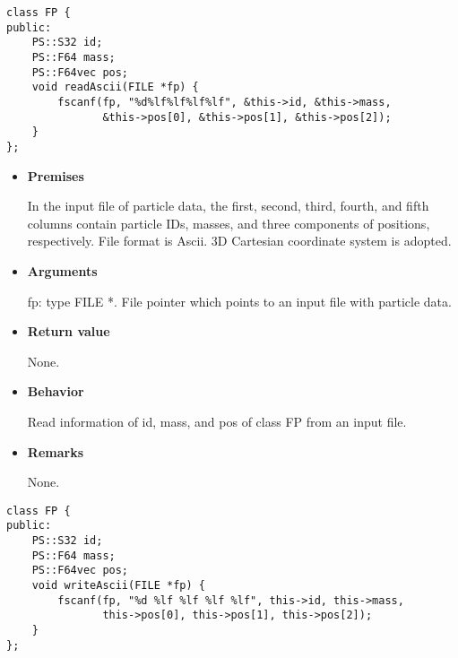 
\begin{screen}
\begin{verbatim}
class FP {
public:
    PS::S32 id;
    PS::F64 mass;
    PS::F64vec pos;
    void readAscii(FILE *fp) {
        fscanf(fp, "%d%lf%lf%lf%lf", &this->id, &this->mass,
               &this->pos[0], &this->pos[1], &this->pos[2]);
    }
};
\end{verbatim}
\end{screen}

\begin{itemize}

\item {\bf Premises}

  In the input file of particle data, the first, second, third,
  fourth, and fifth columns contain particle IDs, masses, and three components of positions, respectively. File format is Ascii. 3D Cartesian coordinate system is adopted.

\item {\bf Arguments}

  fp: type FILE *. File pointer which points to an input file with particle data.
  
\item {\bf Return value}

  None.
  
\item {\bf Behavior}

  Read information of id, mass, and pos of class FP from an input
  file.
  
\item {\bf Remarks}

  None.
  
\end{itemize}


\begin{screen}
\begin{verbatim}
class FP {
public:
    PS::S32 id;
    PS::F64 mass;
    PS::F64vec pos;
    void writeAscii(FILE *fp) {
        fscanf(fp, "%d %lf %lf %lf %lf", this->id, this->mass,
               this->pos[0], this->pos[1], this->pos[2]);
    }
};
\end{verbatim}
\end{screen}

